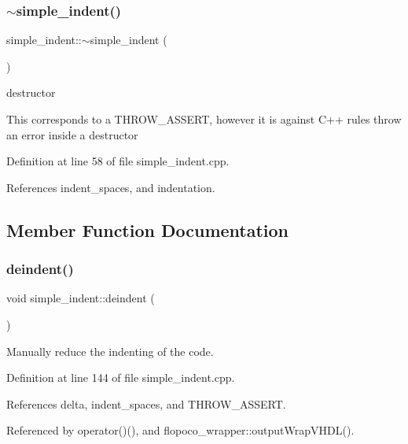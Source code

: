 \subsubsection{\texorpdfstring{$\sim$simple\+\_\+indent()}{~simple\_indent()}}
{\footnotesize\ttfamily simple\+\_\+indent\+::$\sim$simple\+\_\+indent (\begin{DoxyParamCaption}{ }\end{DoxyParamCaption})}



destructor 

This corresponds to a T\+H\+R\+O\+W\+\_\+\+A\+S\+S\+E\+RT, however it is against C++ rules throw an error inside a destructor 

Definition at line 58 of file simple\+\_\+indent.\+cpp.



References indent\+\_\+spaces, and indentation.



\subsection{Member Function Documentation}
\mbox{\label{classsimple__indent_ae22b30d747a97908e638a655364e498f}} 
\subsubsection{\texorpdfstring{deindent()}{deindent()}}
{\footnotesize\ttfamily void simple\+\_\+indent\+::deindent (\begin{DoxyParamCaption}{ }\end{DoxyParamCaption})}



Manually reduce the indenting of the code. 



Definition at line 144 of file simple\+\_\+indent.\+cpp.



References delta, indent\+\_\+spaces, and T\+H\+R\+O\+W\+\_\+\+A\+S\+S\+E\+RT.



Referenced by operator()(), and flopoco\+\_\+wrapper\+::output\+Wrap\+V\+H\+D\+L().

